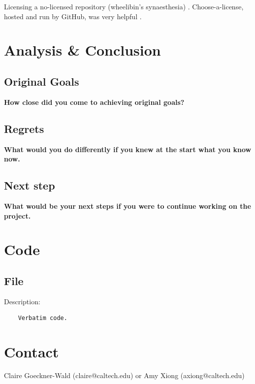 \documentclass[12pt,a4paper]{article}
\begin{document}
Licensing a no-licensed repository (wheelibin's synaesthesia) \cite{synaesthesia-license}. Choose-a-license, hosted and run by GitHub, was very helpful \cite{choose-license-none}.


\section{Analysis \& Conclusion}
\subsection{Original Goals}
\textbf{How close did you come to achieving original goals?}
\subsection{Regrets}
\textbf{What would you do differently if you knew at the start what you know now.}
\subsection{Next step}
\textbf{What would be your next steps if you were to continue working on the project.}


\section{Code}

\subsection{File}

\begin{center}
Description:
	\begin{verbatim}
	Verbatim code.
	\end{verbatim}
\end{center}


\section{Contact}

Claire Goeckner-Wald (claire@caltech.edu) or Amy Xiong (axiong@caltech.edu)
\end{document}
